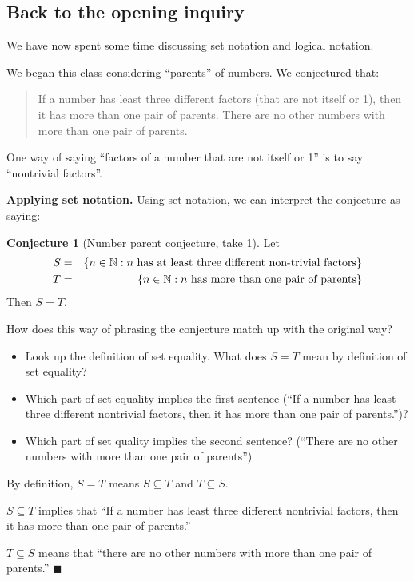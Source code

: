 \documentclass[11pt]{article}
\newenvironment{task}
	{\begin{mdframed}[linecolor=lightgray, linewidth=3pt]\raggedright}
	{\end{mdframed}}
\newcommand\tn{\textnormal}
\newcommand{\N}{\mathbb{N}}
\renewcommand\subset\subseteq
\newcommand\st{:}
\theoremstyle{definition}
\newtheorem{conjecture}[theorem]{Conjecture}
\newenvironment{solution}{{\it Solution.} }{\hfill {\color{lightgray}$\blacksquare$}}
\begin{document}
\subsection{Back to the opening inquiry}

We have now spent some time discussing set notation and logical notation.

We began this class considering ``parents'' of numbers. We conjectured that:

\begin{quote}
If a number has least three different factors (that are not itself or 1), then it has more than one pair of parents. There are no other numbers with more than one pair of parents.
\end{quote}

One way of saying ``factors of a number that are not itself or 1'' is to say ``nontrivial factors''.

{\bf Applying set notation.} Using set notation, we can interpret the conjecture as saying:

\begin{conjecture}[Number parent conjecture, take 1]\label{c: number parent 1}
Let \begin{eqnarray*}
	S&=&\{ n\in \N\st n\tn{ has at least three different non-trivial factors}\} \\ 
	T&=&\{ n\in \N \st n \tn{ has more than one pair of parents}\} 
	\end{eqnarray*}
Then $S=T$.	
\end{conjecture}

\begin{task}
How does this way of phrasing the conjecture match up with the original way? 
	\begin{itemize}
	\item Look up the definition of set equality. What does $S=T$ mean by definition of set equality?
	\item Which part of set equality implies the first sentence (``If a number has least three different nontrivial factors, then it has more than one pair of parents.'')? 
	\item Which part of set quality implies the second sentence? (``There are no other numbers with more than one pair of parents'') 
	\end{itemize}
\end{task}

\begin{solution}
By definition, $S=T$ means $S\subset T$ and $T\subset S$.

$S\subset T$ implies that ``If a number has least three different nontrivial factors, then it has more than one pair of parents.''

$T\subset S$ means that ``there are no other numbers with more than one pair of parents.'' 
\end{solution}
\end{document}
